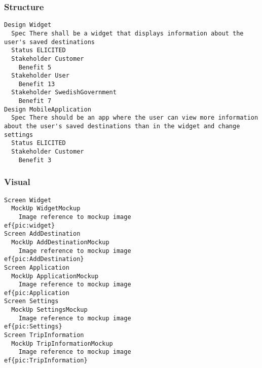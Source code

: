 \begin{lstlisting}

\end{lstlisting}


       \subsubsection{Structure}


\begin{lstlisting}
Design Widget
  Spec There shall be a widget that displays information about the user's saved destinations
  Status ELICITED
  Stakeholder Customer
    Benefit 5
  Stakeholder User
    Benefit 13
  Stakeholder SwedishGovernment
    Benefit 7
Design MobileApplication
  Spec There should be an app where the user can view more information about the user's saved destinations than in the widget and change settings
  Status ELICITED
  Stakeholder Customer
    Benefit 3

\end{lstlisting}
    
        
       \subsubsection{Visual}


\begin{lstlisting}
Screen Widget
  MockUp WidgetMockup
    Image reference to mockup image 
ef{pic:widget}
Screen AddDestination
  MockUp AddDestinationMockup
    Image reference to mockup image 
ef{pic:AddDestination}
Screen Application
  MockUp ApplicationMockup
    Image reference to mockup image 
ef{pic:Application
Screen Settings
  MockUp SettingsMockup
    Image reference to mockup image 
ef{pic:Settings}
Screen TripInformation
  MockUp TripInformationMockup
    Image reference to mockup image 
ef{pic:TripInformation}

\end{lstlisting}